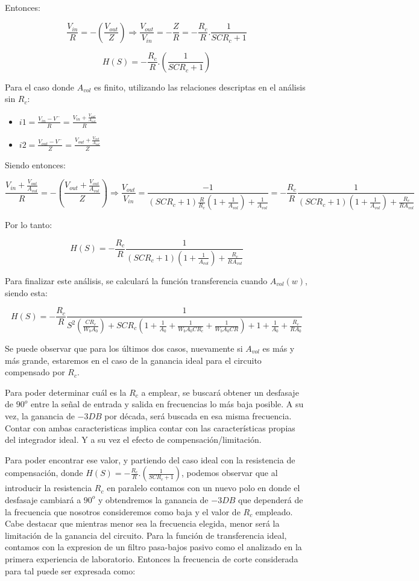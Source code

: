 Entonces:

$$ \frac{V_{in}}{R} = - (\frac{V_{out}}{Z}) \Longrightarrow \frac{V_{out}}{V_{in}} = -\frac{Z}{R} = - \frac{R_c}{R}.\frac{1}{SCR_c+1}$$

$$ H(S) = - \frac{R_c}{R}.(\frac{1}{SCR_c+1})$$

Para el caso donde $A_{vol}$ es finito, utilizando las relaciones descriptas en el análisis sin $R_c$:

\begin{itemize}
	\item $i1 = \frac {V_{in}-V^{-}}{R} =  \frac {V_{in} + \frac{V_{out}}{A_{vol}}}{R}$
	\item $i2 = \frac {V_{out}-V^{-}}{Z} = \frac {V_{out} + \frac{V_{out}}{A_{vol}}}{Z}$
\end{itemize}

Siendo entonces:

$$ \frac {V_{in} + \frac{V_{out}}{A_{vol}}}{R} = -(\frac {V_{out} + \frac{V_{out}}{A_{vol}}}{Z})
\Longrightarrow \frac{V_{out}}{V_{in}} = \frac{-1}{(SCR_c+1)\frac{R}{R_c}(1+\frac{1}{A_{vol}})+\frac{1}{A_{vol}}} = 
-\frac{R_c}{R}\frac{1}{(SCR_c+1)(1+\frac{1}{A_{vol}})+\frac{R_c}{RA_{vol}}} $$

Por lo tanto:

$$H(S)= -\frac{R_c}{R}\frac{1}{(SCR_c+1)(1+\frac{1}{A_{vol}})+\frac{R_c}{RA_{vol}}} $$

Para finalizar este análisis, se calculará la función transferencia cuando $A_{vol}(w)$, siendo esta:

$$H(S)=-\frac{R_c}{R}\frac{1}{S^2(\frac{CR_c}{W_bA_0})+SCR_c(1+\frac{1}{A_0}+\frac{1}{W_bA_0CR_c}+\frac{1}{W_bA_0CR})+1+\frac{1}{A_0}+\frac{R_c}{RA_0}}$$

Se puede observar que para los últimos dos casos, nuevamente si $A_{vol}$ es más y más grande, estaremos en el caso de la ganancia ideal para el circuito compensado
por $R_c$.


Para poder determinar cuál es la $R_c$ a emplear, se buscará obtener un desfasaje de $90^o$ entre la señal de entrada y salida en frecuencias lo más baja posible.
A su vez, la ganancia de $-3DB$ por década, será buscada en esa misma frecuencia.
Contar con ambas caracteristicas implica contar con las características propias del integrador ideal. Y a su vez el efecto de compensación/limitación.


Para poder encontrar ese valor, y partiendo del caso ideal con la resistencia
de compensación, donde $ H(S) = - \frac{R_c}{R}.(\frac{1}{SCR_c+1})$, podemos observar que al introducir la resistencia $R_c$
en paralelo contamos con un nuevo polo en donde el desfasaje cambiará a $90^o$ y obtendremos la ganancia de $-3DB$ que dependerá de la frecuencia que nosotros consideremos como baja y el valor de $R_c$ empleado.
Cabe destacar que mientras menor sea la frecuencia elegida, menor será la limitación de la ganancia del circuito.
Para la función de transferencia ideal, contamos con la expresion de un filtro pasa-bajos pasivo como el analizado en la primera experiencia
de laboratorio. Entonces la frecuencia de corte considerada para tal puede ser expresada como:

